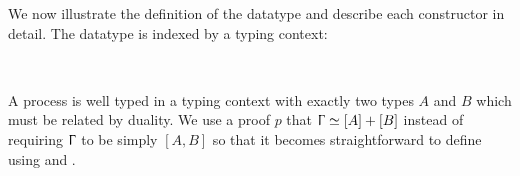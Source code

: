We now illustrate the definition of the  datatype and
describe each constructor in detail. The datatype is indexed by a typing
context:

\begin{AgdaAlign}
\begin{code}%
\>[0]\AgdaSpace{}%
\AgdaSpace{}%
\AgdaSymbol{:}\AgdaSpace{}%
\AgdaSpace{}%
\AgdaSpace{}%
\AgdaSpace{}%
\<%
\\
\>[0][@{}l@{\AgdaIndent{0}}]%
\>[3]%
\>[13]\AgdaSymbol{:}\AgdaSpace{}%
\AgdaSpace{}%
\AgdaSpace{}%
\AgdaSymbol{\}}\AgdaSpace{}%
\AgdaSymbol{(}\AgdaSpace{}%
\AgdaSymbol{:}\AgdaSpace{}%
\AgdaSpace{}%
\AgdaSpace{}%
\AgdaSymbol{)}\AgdaSpace{}%
\AgdaSymbol{(}\AgdaSpace{}%
\AgdaSymbol{:}\AgdaSpace{}%
\AgdaSpace{}%
\AgdaSpace{}%
\AgdaOperator{\AgdaFunction{[}}\AgdaSpace{}%
\AgdaSpace{}%
\AgdaOperator{\AgdaFunction{]}}\AgdaSpace{}%
\AgdaOperator{\AgdaDatatype{+}}\AgdaSpace{}%
\AgdaOperator{\AgdaFunction{[}}\AgdaSpace{}%
\AgdaSpace{}%
\AgdaOperator{\AgdaFunction{]}}\AgdaSymbol{)}\AgdaSpace{}%
\AgdaSpace{}%
\AgdaSpace{}%
\<%
\end{code}

A  process is well typed in a typing context with
exactly two types $A$ and $B$ which must be related by duality. We use a proof
$p$ that $\Upgamma \simeq [A] + [B]$ instead of requiring $\Upgamma$ to be
simply $[A,B]$ so that it becomes straightforward to define \SLink using
 and .

\begin{code}%
%
\>[3]%
\>[13]\AgdaSymbol{:}\AgdaSpace{}%
\AgdaSpace{}%
\AgdaSymbol{\}}\AgdaSpace{}%
\AgdaSymbol{(}\AgdaSpace{}%
\AgdaSymbol{:}\AgdaSpace{}%
\AgdaSpace{}%
\AgdaSpace{}%
\AgdaSpace{}%
\AgdaOperator{\AgdaFunction{,}}\AgdaSpace{}%
\AgdaSymbol{)}\AgdaSpace{}%
\AgdaSpace{}%
\AgdaSpace{}%
\<%
\end{code}


\end{AgdaAlign}
